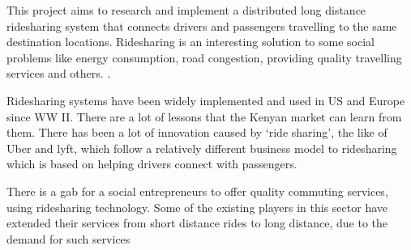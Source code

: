 This project aims to research and implement a distributed long distance ridesharing system that connects drivers and passengers travelling to the same destination locations. Ridesharing is an interesting solution to some social problems like energy consumption, road congestion, providing quality travelling services and others. \citep{noland2006}.

Ridesharing systems have been widely implemented and used in US and Europe since WW II\@. There are a lot of lessons that the Kenyan market can learn from them. There has been a lot of innovation caused by `ride sharing', the like of Uber and lyft, which follow a relatively different business model to ridesharing which is based on helping drivers connect with passengers.

There is a gab for a social entrepreneurs to offer quality commuting services, using ridesharing technology. Some of the existing players in this sector have extended their services from short distance rides to long distance, due to the demand for such services \citep{swvlalvinwanjala}